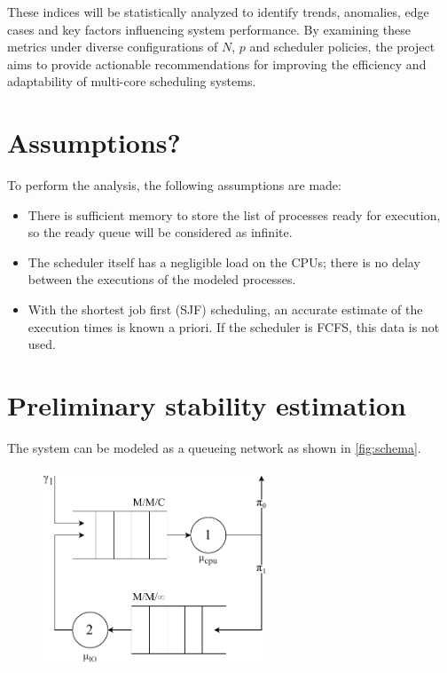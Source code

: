 These indices will be statistically analyzed to identify trends, anomalies, edge cases and key factors influencing system performance. By examining these metrics under diverse configurations of \( N \), \( p \) and scheduler policies, the project aims to provide actionable recommendations for improving the efficiency and adaptability of multi-core scheduling systems.

\section{Assumptions?}
To perform the analysis, the following assumptions are made:
\begin{itemize}
    \item There is sufficient memory to store the list of processes ready for execution, so the ready queue will be considered as infinite.
    \item The scheduler itself has a negligible load on the CPUs; there is no delay between the executions of the modeled processes. 
    \item With the shortest job first (SJF) scheduling, an accurate estimate of the execution times is known a priori. If the scheduler is FCFS, this data is not used.
\end{itemize}




\section{Preliminary stability estimation}

The system can be modeled as a queueing network as shown in \autoref{fig:schema}.

\begin{figure}[H]
    \captionsetup{type=figure}
    \centering
    \includegraphics[width=0.6\textwidth]{images/03/schema.pdf}
    \label{fig:schema}
\end{figure}

